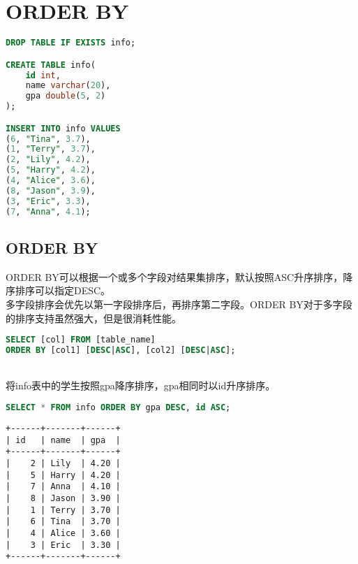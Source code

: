 \documentclass[12pt, openany, oneside]{book}
\begin{document}
\newpage

\chapter{ORDER BY}

\vspace{0.5cm}


\begin{lstlisting}[language=SQL]
DROP TABLE IF EXISTS info;

CREATE TABLE info(
    id int,
    name varchar(20),
    gpa double(5, 2)
);

INSERT INTO info VALUES
(6, "Tina", 3.7),
(1, "Terry", 3.7),
(2, "Lily", 4.2),
(5, "Harry", 4.2),
(4, "Alice", 3.6),
(8, "Jason", 3.9),
(3, "Eric", 3.3),
(7, "Anna", 4.1);
\end{lstlisting}

\vspace{0.5cm}

\section{ORDER BY}

ORDER BY可以根据一个或多个字段对结果集排序，默认按照ASC升序排序，降序排序可以指定DESC。\\

多字段排序会优先以第一字段排序后，再排序第二字段。ORDER BY对于多字段的排序支持虽然强大，但是很消耗性能。

\vspace{-0.5cm}

\begin{lstlisting}[language=SQL]
SELECT [col] FROM [table_name]
ORDER BY [col1] [DESC|ASC], [col2] [DESC|ASC];
\end{lstlisting}

\vspace{0.5cm}

\\

将info表中的学生按照gpa降序排序，gpa相同时以id升序排序。

\vspace{-0.5cm}

\begin{lstlisting}[language=SQL]
SELECT * FROM info ORDER BY gpa DESC, id ASC;
\end{lstlisting}

\begin{tcolorbox}
	\begin{verbatim}
+------+-------+------+
| id   | name  | gpa  |
+------+-------+------+
|    2 | Lily  | 4.20 |
|    5 | Harry | 4.20 |
|    7 | Anna  | 4.10 |
|    8 | Jason | 3.90 |
|    1 | Terry | 3.70 |
|    6 | Tina  | 3.70 |
|    4 | Alice | 3.60 |
|    3 | Eric  | 3.30 |
+------+-------+------+
\end{verbatim}
\end{tcolorbox}
\end{document}
